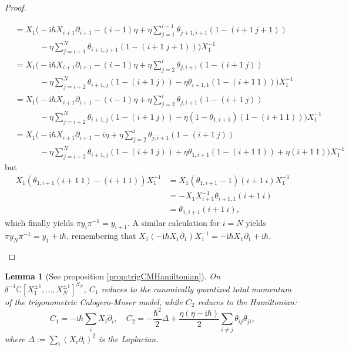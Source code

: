 \documentclass[11pt]{report}
\newtheorem{lemma}[theorem]{Lemma}
\theoremstyle{definition}
\theoremstyle{remark}
\theoremstyle{remark}
\newcommand{\C}{\mathbb{C}}
\newcommand{\I}{\mathrm{i}}
\begin{document}
\begin{proof}
\begin{enumerate}[label=(\roman*)]
\begin{align*}
&= X_1 \bigg( -\I \hbar X_{i+1} \partial_{i+1} - (i-1) \eta + \eta \sum_{j=1}^{i-1} \theta_{j+1,i+1} (1-(i+1 \ j+1)) \\
&\quad \quad \quad - \eta \sum_{j=i+1}^N \theta_{i+1,j+1} (1-(i+1 \ j+1)) \bigg) X_1^{-1} \\
&= X_1 \bigg( -\I \hbar X_{i+1} \partial_{i+1} - (i-1) \eta + \eta \sum_{j=2}^{i} \theta_{j,i+1} (1-(i+1 \ j)) \\
&\quad \quad \quad - \eta \sum_{j=i+2}^N \theta_{i+1,j} (1-(i+1 \ j)) - \eta \theta_{i+1,1} (1-(i+1 \ 1)) \bigg) X_1^{-1} \\
&= X_1 \bigg( -\I \hbar X_{i+1} \partial_{i+1} - (i-1) \eta + \eta \sum_{j=2}^{i} \theta_{j,i+1} (1-(i+1 \ j)) \\
&\quad \quad \quad - \eta \sum_{j=i+2}^N \theta_{i+1,j} (1-(i+1 \ j)) - \eta (1-\theta_{1,i+1})(1-(i+1 \ 1)) \bigg) X_1^{-1} \\
&= X_1 \bigg( -\I \hbar X_{i+1} \partial_{i+1} - i \eta + \eta \sum_{j=2}^{i} \theta_{j,i+1} (1-(i+1 \ j)) \\
&\quad \quad \quad - \eta \sum_{j=i+2}^N \theta_{i+1,j} (1-(i+1 \ j)) + \eta \theta_{1,i+1}(1-(i+1 \ 1)) + \eta(i+1 \ 1) \bigg) X_1^{-1}
\end{align*}
but
\begin{align*}
X_1 (\theta_{1,i+1}(i+1 \ 1) - (i+1 \ 1)) X_1^{-1}
&= X_1 (\theta_{1,i+1}-1) (i+1 \ i) X_1^{-1} \\
&= - X_1 X_{i+1}^{-1} \theta_{i+1,1} (i+1 \ i) \\
&= \theta_{1,i+1} (i+1 \ i),
\end{align*}
which finally yields $\pi y_i \pi^{-1} = y_{i+1}$. A similar calculation for $i=N$ yields $\pi y_N \pi^{-1} = y_1 + \I \hbar$, remembering that $X_1 (-\I \hbar X_1 \partial_1) X_1^{-1} = -\I \hbar X_1 \partial_1 + \I \hbar$.
\vspace{-1.5\baselineskip}
\end{enumerate}
\end{proof}

\begin{lemma}[See proposition \ref{prop:trigCMHamiltonian}]\label{lemma:trigCMHamiltonianAppendix}
On $\delta^{-1} \C[X_1^{\pm 1},...,X_N^{\pm 1}]^{S_N}$, $C_1$ reduces to the canonically quantized total momentum of the trigonometric Calogero-Moser model, while $C_2$ reduces to the Hamiltonian:
\begin{equation*}
C_1 = -\I \hbar \sum_i X_i \partial_i, \quad C_2 = -\frac{\hbar^2}{2} \Delta + \frac{\eta(\eta-\I \hbar)}{2} \sum_{i \neq j} \theta_{ij} \theta_{ji},
\end{equation*}
where $\Delta := \sum_i (X_i \partial_i)^2$ is the Laplacian.
\end{lemma}
\end{document}
